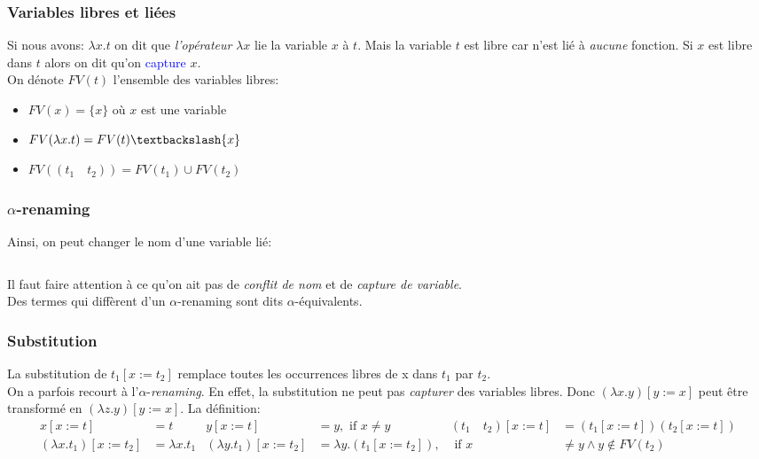 \documentclass{report}
\begin{document}
\subsubsection{Variables libres et liées}	
Si nous avons: $\lambda x.t$ on dit que \textit{l'opérateur} $\lambda x$ lie la variable $x$ à $t$. Mais la variable $t$ est libre car n'est lié à \textit{aucune} fonction. Si $x$ est libre dans $t$ alors on dit qu'on \textcolor{blue}{capture} $x$.\\
On dénote $FV(t)$ l'ensemble des variables libres:
\begin{itemize}
\item $FV(x) = \{x\}$ où $x$ est une variable
\item $FV(\lambda x.t) = FV(t) \textbackslash \{x\}$
\item $FV((t_1 \quad t_2))=FV(t_1) \cup FV(t_2)$
\end{itemize}

\subsubsection{$\alpha$-renaming}
Ainsi, on peut changer le nom d'une variable lié:
\begin{lstlisting}[escapechar=\%]
%$\lambda$% x. x %$\rightarrow_{\alpha}\lambda$%y. y
\end{lstlisting}
Il faut faire attention à ce qu'on ait pas de \textit{conflit de nom} et de \textit{capture de variable}.\\
Des termes qui diffèrent d'un $\alpha$-renaming sont dits $\alpha$-équivalents.

\subsubsection{Substitution} \label{sub}
La substitution de $t_1[x:=t_2]$ remplace toutes les occurrences libres de x dans $t_1$ par $t_2$.\\
On a parfois recourt à l'$\alpha$-\textit{renaming}. En effet, la substitution ne peut pas \textit{capturer} des variables libres. Donc $(\lambda x.y)[y:=x]$ peut être transformé en $(\lambda z.y)[y:=x]$. La définition:
\begin{align*}
x[x:=t] &= t & y[x:=t]&=y, \text{ if } x \neq y & (t_1 \quad t_2)[x:=t]&= (t_1[x:=t])(t_2[x:=t])\\
(\lambda x.t_1)[x:=t_2]&= \lambda x.t_1 & (\lambda y.t_1)[x:=t_2]&= \lambda y.(t_1[x:=t_2]),& \text{ if } x &\neq y \wedge y \notin FV(t_2)
\end{align*}
\end{document}
